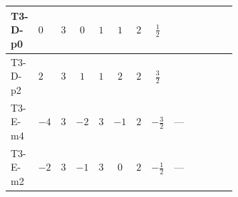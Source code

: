 \documentclass[8pt]{article}
\begin{document}
\begin{landscape}
\begin{longtable}{@{}llcccccc >{\raggedright\arraybackslash}p{0.21\linewidth} >{\raggedright\arraybackslash}p{0.21\linewidth} >{\raggedright\arraybackslash}p{0.21\linewidth}@{}}
\midrule
T3-D-p0 & $0$ & $3$ & $0$ & $1$ & $1$ & $2$ & $\frac{1}{2}$ & \scriptsize\adjustbox{max width=\linewidth}{$\begin{gathered} +\frac{1}{4} (3 \left({y_1}\,\left({y_1}\right)^{\dagger}\,{Y_e}\right)_{ij}+2 \left({y_2}\,\left({y_2}\right)^{\dagger}\,{Y_e}\right)_{ij}+6 \left({Y_e}\,\left({Y_e}\right)^{\dagger}\,{Y_e}\right)_{ij})\end{gathered}$} & \scriptsize\adjustbox{max width=\linewidth}{$\begin{gathered} -\frac{9}{4} {g_2}^2 \left({Y_e}\right)_{ij}\end{gathered}$} & \scriptsize\adjustbox{max width=\linewidth}{$\begin{gathered} -\frac{15}{4} {g_1}^2 \left({Y_e}\right)_{ij}\end{gathered}$} \\
\midrule
T3-D-p2 & $2$ & $3$ & $1$ & $1$ & $2$ & $2$ & $\frac{3}{2}$ & \scriptsize\adjustbox{max width=\linewidth}{$\begin{gathered} +\frac{1}{4} (3 \left({y_1}\,\left({y_1}\right)^{\dagger}\,{Y_e}\right)_{ij}+2 \left({y_2}\,\left({y_2}\right)^{\dagger}\,{Y_e}\right)_{ij}+6 \left({Y_e}\,\left({Y_e}\right)^{\dagger}\,{Y_e}\right)_{ij})\end{gathered}$} & \scriptsize\adjustbox{max width=\linewidth}{$\begin{gathered} -\frac{9}{4} {g_2}^2 \left({Y_e}\right)_{ij}\end{gathered}$} & \scriptsize\adjustbox{max width=\linewidth}{$\begin{gathered} -\frac{15}{4} {g_1}^2 \left({Y_e}\right)_{ij}\end{gathered}$} \\
\midrule
T3-E-m4 & $-4$ & $3$ & $-2$ & $3$ & $-1$ & $2$ & $-\frac{3}{2}$ & --- & \scriptsize\adjustbox{max width=\linewidth}{$\begin{gathered} -\frac{9}{4} {g_2}^2 \left({Y_e}\right)_{ij}\end{gathered}$} & \scriptsize\adjustbox{max width=\linewidth}{$\begin{gathered} -\frac{15}{4} {g_1}^2 \left({Y_e}\right)_{ij}\end{gathered}$} \\
\midrule
T3-E-m2 & $-2$ & $3$ & $-1$ & $3$ & $0$ & $2$ & $-\frac{1}{2}$ & --- & \scriptsize\adjustbox{max width=\linewidth}{$\begin{gathered} -\frac{9}{4} {g_2}^2 \left({Y_e}\right)_{ij}\end{gathered}$} & \scriptsize\adjustbox{max width=\linewidth}{$\begin{gathered} -\frac{15}{4} {g_1}^2 \left({Y_e}\right)_{ij}\end{gathered}$} \\

\end{longtable}
\end{landscape}
\end{document}
